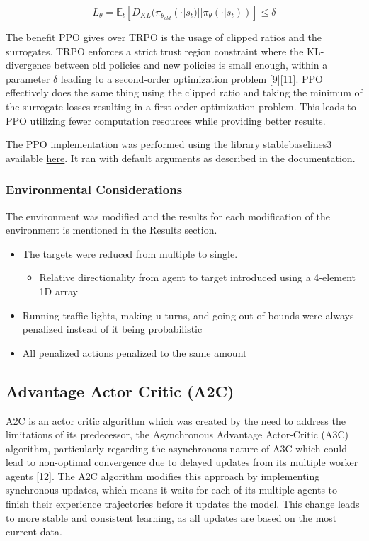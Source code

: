 \documentclass{article}
\begin{document}
	\begin{equation}
		L_{\theta} = \mathbb{E}_{t}[D_{KL}(\pi_{\theta_{old}}(\cdot|s_{t}) || \pi_{\theta}(\cdot|s_{t}))] \leq \delta
	\end{equation}
	
	The benefit PPO gives over TRPO is the usage of clipped ratios and the surrogates. TRPO enforces a strict trust region constraint where the KL-divergence between old policies and new policies is small enough, within a parameter $\delta$ leading to a second-order optimization problem [9][11]. PPO effectively does the same thing using the clipped ratio and taking the minimum of the surrogate losses resulting in a first-order optimization problem. This leads to PPO utilizing fewer computation resources while providing better results.
	
	The PPO implementation was performed using the library stable\textunderscore baselines3 available  \href{https://stable-baselines3.readthedocs.io/en/master/}{here}. It ran with default arguments as described in the documentation.
	
	\subsubsection{Environmental Considerations}
	\label{considerations}
	The environment was modified and the results for each modification of the environment is mentioned in the Results section.
	\begin{itemize}
		\item The targets were reduced from multiple to single. 
		\begin{itemize}
			\item Relative directionality from agent to target introduced using a 4-element 1D array
		\end{itemize}
		\item Running traffic lights, making u-turns, and going out of bounds were always penalized instead of it being probabilistic
		\item All penalized actions penalized to the same amount
	\end{itemize}
	
	\subsection{Advantage Actor Critic (A2C)}
	\label{a2c}
	A2C is an actor critic algorithm which was created by the need to address the limitations of its predecessor, the Asynchronous Advantage Actor-Critic (A3C) algorithm, particularly regarding the asynchronous nature of A3C which could lead to non-optimal convergence due to delayed updates from its multiple worker agents [12]. The A2C algorithm modifies this approach by implementing synchronous updates, which means it waits for each of its multiple agents to finish their experience trajectories before it updates the model. This change leads to more stable and consistent learning, as all updates are based on the most current data.
	
\end{document}

